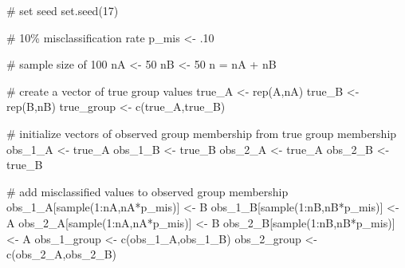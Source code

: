 \documentclass[
  letterpaper,
  DIV=11,
  numbers=noendperiod]{scrreprt}
\newenvironment{Shaded}{\begin{snugshade}}{\end{snugshade}}
\newcommand{\CommentTok}[1]{\textcolor[rgb]{0.37,0.37,0.37}{#1}}
\newcommand{\DecValTok}[1]{\textcolor[rgb]{0.68,0.00,0.00}{#1}}
\newcommand{\FunctionTok}[1]{\textcolor[rgb]{0.28,0.35,0.67}{#1}}
\newcommand{\NormalTok}[1]{\textcolor[rgb]{0.00,0.23,0.31}{#1}}
\newcommand{\OtherTok}[1]{\textcolor[rgb]{0.00,0.23,0.31}{#1}}
\newcommand{\SpecialCharTok}[1]{\textcolor[rgb]{0.37,0.37,0.37}{#1}}
\newcommand{\StringTok}[1]{\textcolor[rgb]{0.13,0.47,0.30}{#1}}
\begin{document}
\begin{Shaded}
\begin{Highlighting}[]
\CommentTok{\# set seed}
\FunctionTok{set.seed}\NormalTok{(}\DecValTok{17}\NormalTok{)}

\CommentTok{\# 10\% misclassification rate}
\NormalTok{p\_mis }\OtherTok{\textless{}{-}}\NormalTok{ .}\DecValTok{10}

\CommentTok{\# sample size of 100}
\NormalTok{nA }\OtherTok{\textless{}{-}} \DecValTok{50}
\NormalTok{nB }\OtherTok{\textless{}{-}} \DecValTok{50}
\NormalTok{n }\OtherTok{=}\NormalTok{ nA }\SpecialCharTok{+}\NormalTok{ nB}

\CommentTok{\# create a vector of true group values}
\NormalTok{true\_A }\OtherTok{\textless{}{-}} \FunctionTok{rep}\NormalTok{(}\StringTok{\textquotesingle{}A\textquotesingle{}}\NormalTok{,nA)}
\NormalTok{true\_B }\OtherTok{\textless{}{-}} \FunctionTok{rep}\NormalTok{(}\StringTok{\textquotesingle{}B\textquotesingle{}}\NormalTok{,nB)}
\NormalTok{true\_group }\OtherTok{\textless{}{-}} \FunctionTok{c}\NormalTok{(true\_A,true\_B)}

\CommentTok{\# initialize vectors of observed group membership from true group membership}
\NormalTok{obs\_1\_A }\OtherTok{\textless{}{-}}\NormalTok{ true\_A}
\NormalTok{obs\_1\_B }\OtherTok{\textless{}{-}}\NormalTok{ true\_B}
\NormalTok{obs\_2\_A }\OtherTok{\textless{}{-}}\NormalTok{ true\_A}
\NormalTok{obs\_2\_B }\OtherTok{\textless{}{-}}\NormalTok{ true\_B}

\CommentTok{\# add misclassified values to observed group membership}
\NormalTok{obs\_1\_A[}\FunctionTok{sample}\NormalTok{(}\DecValTok{1}\SpecialCharTok{:}\NormalTok{nA,nA}\SpecialCharTok{*}\NormalTok{p\_mis)] }\OtherTok{\textless{}{-}} \StringTok{\textquotesingle{}B\textquotesingle{}}
\NormalTok{obs\_1\_B[}\FunctionTok{sample}\NormalTok{(}\DecValTok{1}\SpecialCharTok{:}\NormalTok{nB,nB}\SpecialCharTok{*}\NormalTok{p\_mis)] }\OtherTok{\textless{}{-}} \StringTok{\textquotesingle{}A\textquotesingle{}}
\NormalTok{obs\_2\_A[}\FunctionTok{sample}\NormalTok{(}\DecValTok{1}\SpecialCharTok{:}\NormalTok{nA,nA}\SpecialCharTok{*}\NormalTok{p\_mis)] }\OtherTok{\textless{}{-}} \StringTok{\textquotesingle{}B\textquotesingle{}}
\NormalTok{obs\_2\_B[}\FunctionTok{sample}\NormalTok{(}\DecValTok{1}\SpecialCharTok{:}\NormalTok{nB,nB}\SpecialCharTok{*}\NormalTok{p\_mis)] }\OtherTok{\textless{}{-}} \StringTok{\textquotesingle{}A\textquotesingle{}}
\NormalTok{obs\_1\_group }\OtherTok{\textless{}{-}} \FunctionTok{c}\NormalTok{(obs\_1\_A,obs\_1\_B)}
\NormalTok{obs\_2\_group }\OtherTok{\textless{}{-}} \FunctionTok{c}\NormalTok{(obs\_2\_A,obs\_2\_B)}
\end{Highlighting}
\end{Shaded}
\end{document}
